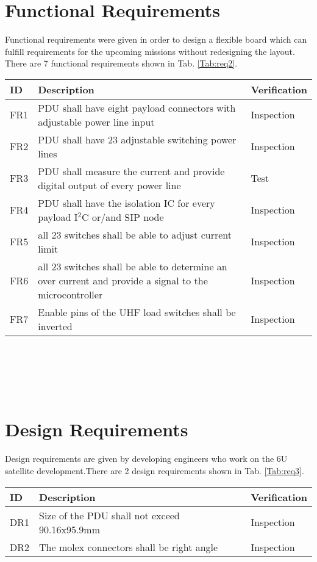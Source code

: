\section{Functional Requirements}
Functional requirements were given in order to design a flexible board which can fulfill requirements for the upcoming missions without redesigning the layout. There are 7 functional requirements shown in Tab. \ref{Tab:req2}. 
\begin{tabular}{p{1cm}p{11cm}p{2cm}} \toprule
	ID & Description & Verification\\ \midrule
FR1 & PDU shall have eight payload connectors with adjustable power line input & Inspection\\
FR2 & PDU shall have 23 adjustable switching power lines & Inspection\\
FR3 & PDU shall measure the current and provide digital output of every power line & Test\\
FR4 & PDU shall have the isolation IC for every payload I$^2$C or/and SIP node & Inspection\\
FR5 &  all 23 switches shall be able to adjust current limit & Inspection\\
FR6 & all 23 switches shall be able to determine an over current and provide a signal to the microcontroller & Inspection\\
FR7 & Enable pins of the UHF load switches shall be inverted & Inspection\\
\bottomrule
\end{tabular}\\ \\ \\ \\
\label{Tab:req2}

\section{Design Requirements}
Design requirements are given by developing engineers who work on the 6U satellite development.There are 2 design requirements  shown in Tab. \ref{Tab:req3}. 

\begin{tabular}{p{1cm}p{11cm}p{2cm}} \toprule
	ID & Description & Verification \\ \midrule
DR1 & Size of the PDU shall not exceed 90.16x95.9mm & Inspection\\
  
DR2 & The molex connectors shall be right angle & Inspection\\
\bottomrule
\end{tabular}\\ 
\label{Tab:req3}




